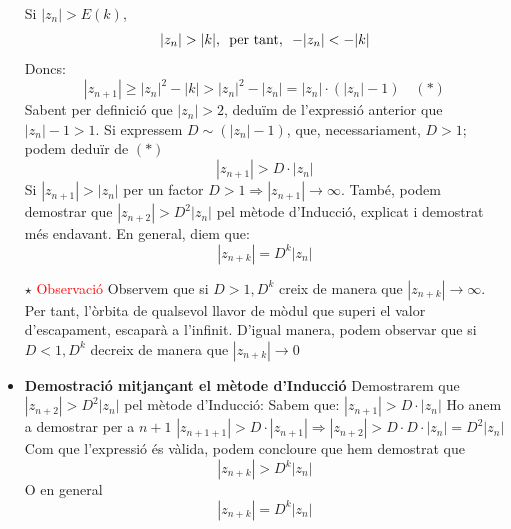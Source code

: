 \documentclass[12pt]{report}
\begin{document}
\begin{itemize}
    Si $|z_n|>E(k)$,
    $$|z_n|>|k|, \hspace{0.5em}\text{per tant}, \hspace{0.5em} -|z_n| < -|k|$$
    Doncs:
    $$|z_{n+1}| \geq |z_n|^2-|k| > |z_n|^2-|z_n|=|z_n|\cdot(|z_n|-1) \hspace{1em}(\ast)$$
    Sabent per definició que $|z_n|>2$, deduïm de l'expressió anterior que $|z_n|-1>1$. 
    \newline
    Si expressem $D \sim (|z_n|-1)$, que, necessariament, $D>1$; podem deduïr de $(\ast)$
    $$|z_{n+1}|>D\cdot |z_n|$$
    Si $|z_{n+1}|>|z_n|$ per un factor $D>1 \Rightarrow|z_{n+1}| \rightarrow \infty$.
    \newline
    També, podem demostrar que $|z_{n+2}|>D^2|z_n|$ pel mètode d'Inducció, explicat i demostrat més endavant.
    \newline
    En general, diem que:
    $$|z_{n+k}|=D^k|z_n|$$
    \item[$\star$] \textcolor{red}{Observació}
    \newline
    Observem que si $D>1, D^k$ creix de manera que $|z_{n+k}|\rightarrow\infty$. Per tant, l'òrbita de qualsevol llavor de mòdul que superi el valor d'escapament, escaparà a l'infinit.
    \newline
    D'igual manera, podem observar que si  $D<1, D^k$ decreix de manera que $|z_{n+k}| \rightarrow 0$
    
    \item \textbf{Demostració mitjançant el mètode d'Inducció}
    \newline
    Demostrarem que $|z_{n+2}|>D^2|z_n|$ pel mètode d'Inducció:
\newline
\newline
Sabem que: $|z_{n+1}|>D\cdot |z_n|$
\newline
Ho anem a demostrar per a $n+1$
\newline
 $|z_{n+1+1}|>D \cdot |z_{n+1}| \Longrightarrow |z_{n+2}| > D \cdot D \cdot |z_n| = D^2|z_n|$ 
 \newline
 Com que l'expressió és vàlida, podem concloure que hem demostrat que
 $$|z_{n+k}|>D^k|z_n|$$
 O en general
 $$|z_{n+k}|=D^k|z_n|$$
\end{itemize}
\end{document}
